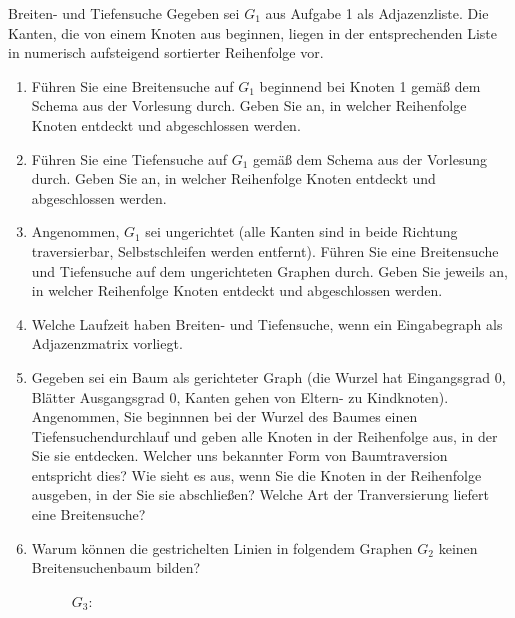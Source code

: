 \documentclass[11pt,a4paper]{article}
\begin{document}
\begin{aufgabe}{2}{Breiten- und Tiefensuche}
    Gegeben sei $G_1$ aus Aufgabe 1 als Adjazenzliste.
    Die Kanten, die von einem Knoten aus beginnen, liegen in der entsprechenden Liste in numerisch aufsteigend sortierter Reihenfolge vor.
    \begin{enumerate}
        \item Führen Sie eine Breitensuche auf $G_1$ beginnend bei Knoten 1 gemäß dem Schema aus der Vorlesung durch.
        Geben Sie an, in welcher Reihenfolge Knoten ent\-deckt und abgeschlossen werden.
        \item Führen Sie eine Tiefensuche auf $G_1$ gemäß dem Schema aus der Vorlesung durch.
        Geben Sie an, in welcher Reihenfolge Knoten entdeckt und abgeschlossen werden.
        \item Angenommen, $G_1$ sei ungerichtet (alle Kanten sind in beide Richtung traversierbar, Selbstschleifen werden entfernt).
        Führen Sie eine Breitensuche und Tiefensuche auf dem ungerichteten Graphen durch.
        Geben Sie jeweils an, in welcher Reihenfolge Knoten entdeckt und abgeschlossen werden.
        \item Welche Laufzeit haben Breiten- und Tiefensuche, wenn ein Eingabegraph als Adjazenzmatrix vorliegt.
        \item
        Gegeben sei ein Baum als gerichteter Graph (die Wurzel hat Eingangsgrad 0, Blätter Ausgangsgrad 0, Kanten gehen von Eltern- zu Kindknoten).
        Angenommen, Sie beginnnen bei der Wurzel des Baumes einen Tiefensuchendurchlauf und geben alle Knoten in der Reihenfolge aus, in der Sie sie entdecken.
        Welcher uns bekannter Form von Baumtraversion entspricht dies?
        Wie sieht es aus, wenn Sie die Knoten in der Reihenfolge ausgeben, in der Sie sie abschließen?
        Welche Art der Tranversierung liefert eine Breitensuche?
        \item
        Warum können die gestrichelten Linien in folgendem Graphen $G_2$ keinen Breitensuchenbaum bilden?
        \begin{figure}[h!]
            \centering
        $G_3$:
        \begin{subfigure}[c]{0.2\textwidth}
            \centering
\end{subfigure}
\end{figure}
\end{enumerate}
\end{aufgabe}
\end{document}

